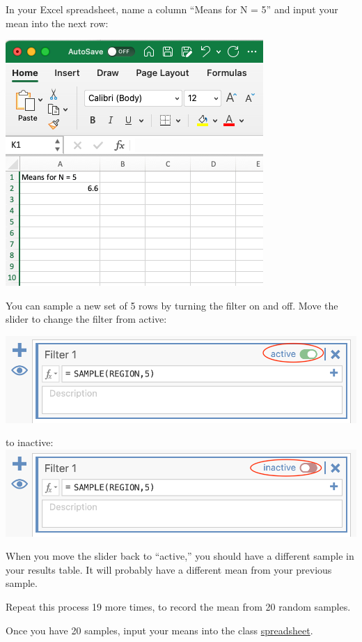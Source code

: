 \documentclass[
]{book}
\begin{document}
In your Excel spreadsheet, name a column ``Means for N = 5'' and input your mean into the next row:

\includegraphics{img/ExcelN5.png}

You can sample a new set of 5 rows by turning the filter on and off. Move the slider to change the filter from active:

\includegraphics{img/ActiveFilter.png}

to inactive:
\includegraphics{img/InactiveFilter.png}

When you move the slider back to ``active,'' you should have a different sample in your results table. It will probably have a different mean from your previous sample.

Repeat this process 19 more times, to record the mean from 20 random samples.

Once you have 20 samples, input your means into the class \href{https://moodle.stfx.ca/course/view.php?id=26030\#section-10}{spreadsheet}.
\end{document}

